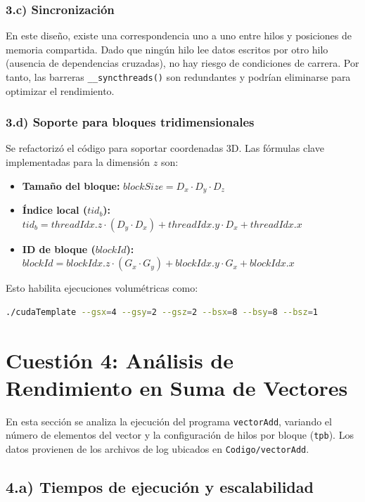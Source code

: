 \documentclass[12pt,a4paper]{report}
\begin{document}
\subsection{3.c) Sincronización}
En este diseño, existe una correspondencia uno a uno entre hilos y posiciones de memoria compartida. Dado que ningún hilo lee datos escritos por otro hilo (ausencia de dependencias cruzadas), no hay riesgo de condiciones de carrera. Por tanto, las barreras \texttt{\_\_syncthreads()} son redundantes y podrían eliminarse para optimizar el rendimiento.

\subsection{3.d) Soporte para bloques tridimensionales}
Se refactorizó el código para soportar coordenadas 3D. Las fórmulas clave implementadas para la dimensión $z$ son:

\begin{itemize}
    \item \textbf{Tamaño del bloque:} $blockSize = D_x \cdot D_y \cdot D_z$
    \item \textbf{Índice local ($tid_b$):} $tid_b = threadIdx.z \cdot (D_y \cdot D_x) + threadIdx.y \cdot D_x + threadIdx.x$
    \item \textbf{ID de bloque ($blockId$):} $blockId = blockIdx.z \cdot (G_x \cdot G_y) + blockIdx.y \cdot G_x + blockIdx.x$
\end{itemize}

Esto habilita ejecuciones volumétricas como:
\begin{lstlisting}[language=bash]
./cudaTemplate --gsx=4 --gsy=2 --gsz=2 --bsx=8 --bsy=8 --bsz=1
\end{lstlisting}

\chapter{Cuestión 4: Análisis de Rendimiento en Suma de Vectores}

En esta sección se analiza la ejecución del programa \texttt{vectorAdd}, variando el número de elementos del vector y la configuración de hilos por bloque (\texttt{tpb}). Los datos provienen de los archivos de log ubicados en \texttt{Codigo/vectorAdd}.

\section{4.a) Tiempos de ejecución y escalabilidad}
\end{document}
